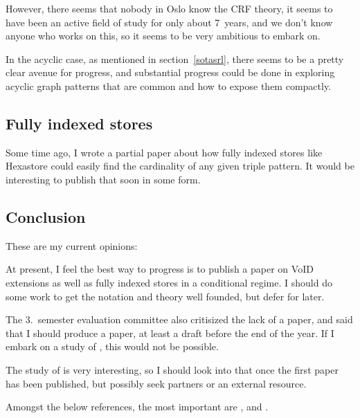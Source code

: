 However, there seems that nobody in Oslo know the CRF theory, it seems
to have been an active field of study for only about 7~years, and we don't
know anyone who works on this, so it seems to be very ambitious to
embark on. 

In the acyclic case, as mentioned in section~\ref{sotasrl}, there
seems to be a pretty clear avenue for progress, and substantial
progress could be done in exploring acyclic graph patterns that are
common and how to expose them compactly.


\subsection{Fully indexed stores}

Some time ago, I wrote a partial paper about how fully indexed stores
like Hexastore \cite{Weiss:2008:HSI:1453856.1453965} could easily find the cardinality of
any given triple pattern. It would be interesting to publish that soon
in some form.

\subsection{Conclusion}

These are my current opinions: 

At present, I feel the best way to progress is to publish a paper on
VoID extensions as well as fully indexed stores in a conditional
regime. I should do some work to get the notation and theory well
founded, but defer \SRL{} for later.

The 3.~semester evaluation committee also critisized the lack of a
paper, and said that I should produce a paper, at least a draft before
the end of the year. If I embark on a study of \SRL{}, this would not
be possible.

The study of \SRL{} is very interesting, so I should look into that
once the first paper has been published, but possibly seek partners or
an external resource. 

Amongst the below references, the most important are
\cite{selectivityPRM}, \cite{splendid} and \cite{Lin:2011:LRB:2063016.2063042}.
